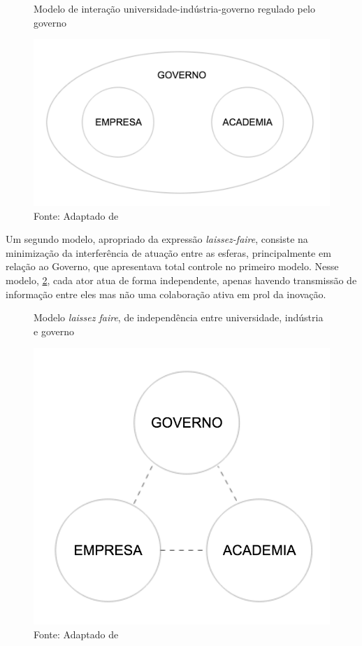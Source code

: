 \begin{figure}[H]
\caption{Modelo de interação universidade-indústria-governo regulado pelo governo}
\centerline{\includegraphics[scale=0.5]{img/triplehelix1}}
\label{fig:triplehelix1}
\caption* {Fonte: Adaptado de }
\end{figure}

Um segundo modelo, apropriado da expressão \textit{laissez-faire}, consiste na minimização da interferência de atuação entre as esferas, principalmente em relação ao Governo, que apresentava total controle no primeiro modelo. Nesse modelo, \ref{fig:triplehelix2}, cada ator atua de forma independente, apenas havendo transmissão de informação entre eles mas não uma colaboração ativa em prol da inovação.

\begin{figure}[H]
\caption{Modelo \textit{laissez faire}, de independência entre universidade, indústria e governo}
\centerline{\includegraphics[scale=0.5]{img/triplehelix2}}
\label{fig:triplehelix2}
\caption* {Fonte: Adaptado de }
\end{figure}

